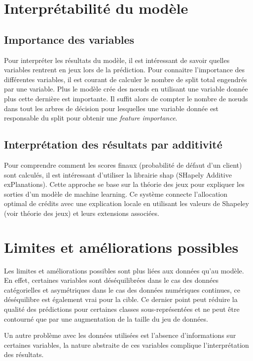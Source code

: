 \section{Interprétabilité du modèle}

	\subsection{Importance des variables}
	Pour interpréter les résultats du modèle, il est intéressant de savoir quelles variables rentrent en jeux lors de la prédiction.
	Pour connaitre l'importance des différentes variables, il est courant de calculer le nombre de split total engendrés par une variable.
	Plus le modèle crée des n\oe uds en utilisant une variable donnée plus cette dernière est importante. Il suffit alors de compter le
	nombre de n\oe uds dans tout les arbres de décision pour lesquelles une variable donnée est responsable du split pour obtenir une \emph{feature importance}.
	
	\subsection{Interprétation des résultats par additivité}
	Pour comprendre comment les scores finaux (probabilité de défaut d'un client) sont calculés, il est intéressant d'utiliser la librairie shap \cite{NIPS2017_7062} (SHapely Additive exPlanations). 
	Cette approche se base sur la théorie des jeux pour expliquer les sorties d'un modèle de machine learning. Ce système connecte l'allocation optimal de crédits
	avec une explication locale en utilisant les valeurs de Shapeley (voir théorie des jeux) et leurs extensions associées.
	
\section{Limites et améliorations possibles}
	Les limites et améliorations possibles sont plus liées aux données qu'au modèle. 
	En effet, certaines variables sont déséquilibrées dans le cas des données catégorielles 
	et asymétriques dans le cas des données numériques continues, ce déséquilibre est également vrai pour la cible. 
	Ce dernier point peut réduire la qualité des prédictions pour certaines classes sous-représentées et ne peut 
	être contourné que par une augmentation de la taille du jeu de données.
	
	Un autre problème avec les données utilisées est l'absence d'informations sur certaines variables,
	la nature abstraite de ces variables complique l'interprétation des résultats.